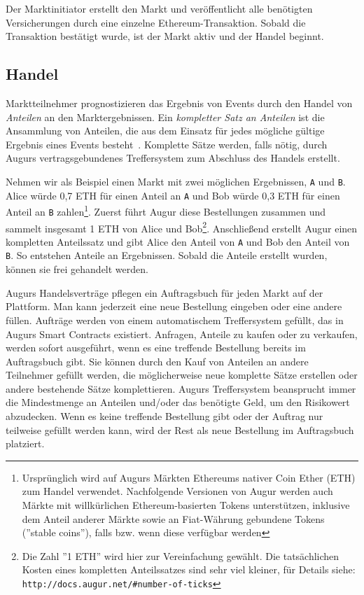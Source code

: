 \documentclass[floatfix,reprint,nofootinbib,amsmath,amssymb,epsfig,pre,floats,letterpaper,groupedaffiliation]{revtex4-1}
\theoremstyle{definition}
\theoremstyle{definition}
\theoremstyle{definition}
\begin{document}
Der Marktinitiator erstellt den Markt und veröffentlicht alle benötigten Versicherungen durch eine einzelne Ethereum-Transaktion. Sobald die Transaktion bestätigt wurde, ist der Markt aktiv und der Handel beginnt.

\subsection{Handel}

Marktteilnehmer prognostizieren das Ergebnis von Events durch den Handel von \textit{Anteilen} an den Marktergebnissen. Ein \textit{kompletter Satz an Anteilen} ist die Ansammlung von Anteilen, die aus dem Einsatz für jedes mögliche gültige Ergebnis eines Events besteht~\cite{Clark_2014}. Komplette Sätze werden, falls nötig, durch Augurs vertragsgebundenes Treffersystem zum Abschluss des Handels erstellt.

Nehmen wir als Beispiel einen Markt mit zwei möglichen Ergebnissen, \texttt{A} und \texttt{B}. Alice würde 0,7 ETH für einen Anteil an \texttt{A} und Bob würde 0,3 ETH für einen Anteil an \texttt{B} zahlen\footnote{Ursprünglich wird auf Augurs Märkten Ethereums nativer Coin Ether (ETH) zum Handel verwendet. Nachfolgende Versionen von Augur werden auch Märkte mit willkürlichen Ethereum-basierten Tokens unterstützen, inklusive dem Anteil anderer Märkte sowie an Fiat-Währung gebundene Tokens (''stable coins''), falls bzw. wenn diese verfügbar werden}. Zuerst führt Augur diese Bestellungen zusammen und sammelt insgesamt 1 ETH von Alice und Bob\footnote{Die Zahl ''1 ETH'' wird hier zur Vereinfachung gewählt. Die tatsächlichen Kosten eines kompletten Anteilssatzes sind sehr viel kleiner, für Details siehe: \texttt{http://docs.augur.net/\#number-of-ticks}\label{footnote:complete_set_cost}}. Anschließend erstellt Augur einen kompletten Anteilssatz und gibt Alice den Anteil von \texttt{A} und Bob den Anteil von \texttt{B}. So entstehen Anteile an Ergebnissen. Sobald die Anteile erstellt wurden, können sie frei gehandelt werden.

Augurs Handelsverträge pflegen ein Auftragsbuch für jeden Markt auf der Plattform. Man kann jederzeit eine neue Bestellung eingeben oder eine andere füllen. Aufträge werden von einem automatischem Treffersystem gefüllt, das in Augurs Smart Contracts existiert. Anfragen, Anteile zu kaufen oder zu verkaufen, werden sofort ausgeführt, wenn es eine treffende Bestellung bereits im Auftragsbuch gibt. Sie können durch den Kauf von Anteilen an andere Teilnehmer gefüllt werden, die möglicherweise neue komplette Sätze erstellen oder andere bestehende Sätze komplettieren. Augurs Treffersystem beansprucht immer die Mindestmenge an Anteilen und/oder das benötigte Geld, um den Risikowert abzudecken. Wenn es keine treffende Bestellung gibt oder der Auftrag nur teilweise gefüllt werden kann, wird der Rest als neue Bestellung im Auftragsbuch platziert.
\end{document}
